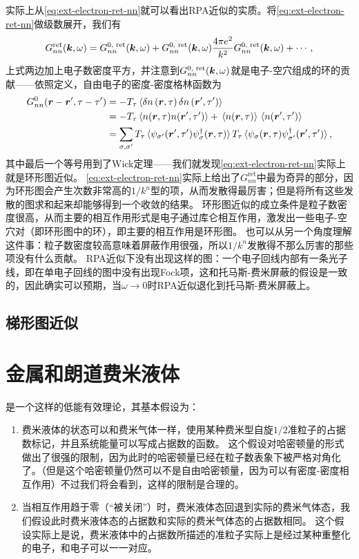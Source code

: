 实际上从\eqref{eq:ext-electron-ret-nn}就可以看出RPA近似的实质。将\eqref{eq:ext-electron-ret-nn}做级数展开，我们有
\[
    G^\text{ret}_{nn}(\vb*{k}, \omega) = G^\text{0, ret}_{nn}(\vb*{k}, \omega) + G^\text{0, ret}_{nn}(\vb*{k}, \omega) \frac{4\pi e^2}{k^2} G^\text{0, ret}_{nn}(\vb*{k}, \omega) + \cdots,
\]
上式两边加上电子数密度平方，并注意到$G^\text{0, ret}_{nn}(\vb*{k}, \omega)$就是电子-空穴组成的环的贡献——依照定义，自由电子的密度-密度格林函数为
\[
    \begin{aligned}
        G_{nn}^\text{0}(\vb*{r}-\vb*{r}', \tau-\tau') &= - T_\tau \expval*{\var{{n}}(\vb*{r}, \tau) \var{{n}}(\vb*{r}', \tau')} \\
        &= - T_\tau \expval*{{{n}}(\vb*{r}, \tau) {{n}}(\vb*{r}', \tau')} + \expval*{{n}(\vb*{r}, \tau)} \expval*{{n}(\vb*{r}', \tau')} \\
        &= \sum_{\sigma, \sigma'} T_\tau \expval*{{\psi}_{\sigma'}(\vb*{r}', \tau') {\psi}^\dagger_\sigma(\vb*{r}, \tau)} T_\tau \expval*{ {\psi}_\sigma(\vb*{r}, \tau) {\psi}^\dagger_{\sigma'}(\vb*{r}', \tau') } ,
    \end{aligned}
\]
其中最后一个等号用到了Wick定理——我们就发现\eqref{eq:ext-electron-ret-nn}实际上就是环形图近似。
\eqref{eq:ext-electron-ret-nn}实际上给出了$G^\text{ret}_{nn}$中最为奇异的部分，因为环形图会产生次数非常高的$1/k^n$型的项，从而发散得最厉害；但是将所有这些发散的图求和起来却能够得到一个收敛的结果。
环形图近似的成立条件是粒子数密度很高，从而主要的相互作用形式是电子通过库仑相互作用，激发出一些电子-空穴对（即环形图中的环），即主要的相互作用是环形图。
也可以从另一个角度理解这件事：粒子数密度较高意味着屏蔽作用很强，所以$1/k^n$发散得不那么厉害的那些项没有什么贡献。
RPA近似下没有出现这样的图：一个电子回线内部有一条光子线，即在单电子回线的图中没有出现Fock项，这和托马斯-费米屏蔽的假设是一致的，因此确实可以预期，当$\omega \to 0$时RPA近似退化到托马斯-费米屏蔽上。

\subsection{梯形图近似}

\section{金属和朗道费米液体}\label{sec:landau-fermi-liquid}

是一个这样的低能有效理论，其基本假设为：
\begin{enumerate}
    \item 费米液体的状态可以和费米气体一样，使用某种费米型自旋$1/2$准粒子的占据数标记，并且系统能量可以写成占据数的函数。
    这个假设对哈密顿量的形式做出了很强的限制，因为此时的哈密顿量已经在粒子数表象下被严格对角化了。（但是这个哈密顿量仍然可以不是自由哈密顿量，因为可以有密度-密度相互作用）不过我们将会看到，这样的限制是合理的。
    \item 当相互作用趋于零（“被关闭”）时，费米液体态回退到实际的费米气体态，我们假设此时费米液体态的占据数和实际的费米气体态的占据数相同。
    这个假设实际上是说，费米液体中的占据数所描述的准粒子实际上是经过某种重整化的电子，和电子可以一一对应。
\end{enumerate}

